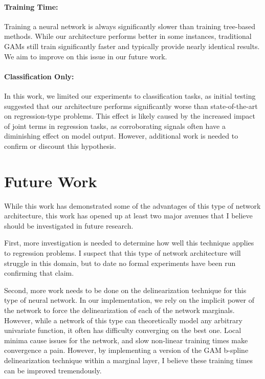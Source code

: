 \paragraph{Training Time:} Training a neural network is always significantly slower than training tree-based methods. While our architecture performs better in some instances, traditional GAMs still train significantly faster and typically provide nearly identical results. We aim to improve on this issue in our future work.

\paragraph{Classification Only:} In this work, we limited our experiments to classification tasks, as initial testing suggested that our architecture performs significantly worse than state-of-the-art on regression-type problems. This effect is likely caused by the increased impact of joint terms in regression tasks, as corroborating signals often  have a diminishing effect on model output. However, additional work is needed to confirm or discount this hypothesis. 


\section{Future Work}

While this work has demonstrated some of the advantages of this type of network architecture, this work has opened up at least two major avenues that I believe should be investigated in future research. 

First, more investigation is needed to determine how well this technique applies to regression problems. I suspect that this type of network architecture will struggle in this domain, but to date no formal experiments have been run confirming that claim.

Second, more work needs to be done on the delinearization technique for this type of neural network. In our implementation, we rely on the implicit power of the network to force the delinearization of each of the network marginals. However, while a network of this type can theoretically model any arbitrary univariate function, it often has difficulty converging on the best one. Local minima cause issues for the network, and slow non-linear training times make convergence a pain. However, by implementing a version of the GAM b-spline delinearization technique within a marginal layer, I believe these training times can be improved tremendously. 








